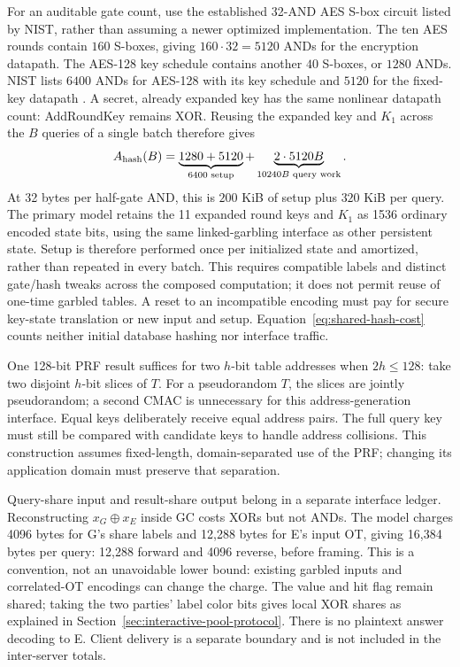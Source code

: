 \documentclass[11pt]{article}
\begin{document}
For an auditable gate count, use the established 32-AND AES S-box circuit listed
by NIST, rather than assuming a newer optimized implementation.  The ten AES
rounds contain $160$ S-boxes, giving $160\cdot32=5120$ ANDs for the encryption
datapath.  The AES-128 key schedule contains another $40$ S-boxes, or $1280$
ANDs.  NIST lists $6400$ ANDs for AES-128 with its key schedule and $5120$ for
the fixed-key datapath \cite{nistcircuits}.  A secret, already expanded key has
the same nonlinear datapath count: AddRoundKey remains XOR.  Reusing the
expanded key and $K_1$ across the $B$ queries of a single batch therefore gives
\begin{equation}
 A_{\rm hash}(B)=
 \underbrace{1280+5120}_{6400\text{ setup}}
 +\underbrace{2\cdot5120B}_{10240B\text{ query work}}.
 \label{eq:shared-hash-cost}
\end{equation}
At 32 bytes per half-gate AND, this is $200$ KiB of setup plus $320$ KiB per
query.  The primary model retains the 11 expanded round keys and $K_1$ as
1536 ordinary encoded state bits, using the same linked-garbling interface
as other persistent state.  Setup is therefore performed once per initialized
state and amortized, rather than repeated in every batch.  This requires
compatible labels and distinct gate/hash tweaks across the composed
computation; it does not permit reuse of one-time garbled tables.  A reset to
an incompatible encoding must pay for secure key-state translation or new
input and setup.  Equation~\eqref{eq:shared-hash-cost} counts neither initial
database hashing nor interface traffic.

One 128-bit PRF result suffices for two $h$-bit table addresses when $2h\le128$:
take two disjoint $h$-bit slices of $T$.  For a pseudorandom $T$, the slices are
jointly pseudorandom; a second CMAC is unnecessary for this address-generation
interface.  Equal keys deliberately receive equal address pairs.  The full
query key must still be compared with candidate keys to handle address
collisions.  This construction assumes fixed-length, domain-separated use of
the PRF; changing its application domain must preserve that separation.

Query-share input and result-share output belong in a separate interface ledger.
Reconstructing $x_G\oplus x_E$ inside GC costs XORs but not ANDs.  The model
charges 4096 bytes for G's share labels and 12,288 bytes for E's input OT,
giving 16,384 bytes per query: 12,288 forward and 4096 reverse, before framing.
This is a convention, not an unavoidable lower bound: existing garbled inputs
and correlated-OT encodings can change the charge.  The value and hit flag
remain shared; taking the two parties' label color bits gives local XOR
shares as explained in Section~\ref{sec:interactive-pool-protocol}.
There is no plaintext answer decoding to E.  Client delivery is a separate
boundary and is not included in the inter-server totals.
\end{document}
